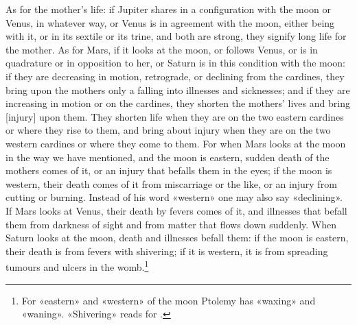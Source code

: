 \documentclass[11pt]{article}
\newcommand{\Fol}[1]{\marginpar{\footnotesize\color{gray}f.\,#1}}
\begin{document}
\par \Fol{38r}As for the mother's life: if Jupiter shares in a configuration with the moon or Venus, in whatever way, or Venus is in agreement with the moon, either being with it, or in its sextile or its trine, and both are strong, they signify long life for the mother. As for Mars, if it looks at the moon, or follows Venus, or is in quadrature or in opposition to her, or Saturn is in this condition with the moon: if they are decreasing in motion, retrograde, or declining from the cardines, they bring upon the mothers only a falling into illnesses and sicknesses; and if they are increasing in motion or on the cardines, they shorten the mothers' lives and bring [injury] upon them. They shorten life when they are on the two eastern cardines or where they rise to them, and bring about injury when they are on the two western cardines or where they come to them. For when Mars looks at the moon in the way we have mentioned, and the moon is eastern, sudden death of the mothers comes of it, or an injury that befalls them in the eyes; if the moon is western, their death comes of it from miscarriage or the like, or an injury from cutting or burning. Instead of his word «western» one may also say «declining». If Mars looks at Venus, their death by fevers comes of it, and illnesses that befall them from darkness of sight and from matter that flows down suddenly. When Saturn looks at the moon, death and illnesses befall them: if the moon is eastern, their death is from fevers with shivering; if it is western, it is from spreading tumours and ulcers in the womb.\footnote{For «eastern» and «western» of the moon Ptolemy has «waxing» and «waning». «Shivering» reads  for .}\par
\end{document}

